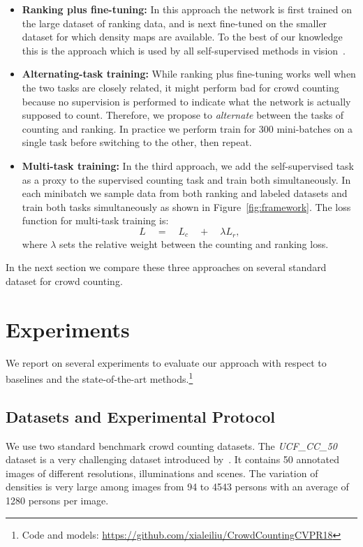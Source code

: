 \documentclass[10pt,twocolumn,letterpaper]{article}
\begin{document}
\begin{itemize}
\item \textbf{Ranking plus fine-tuning:} In this approach the network
  is first trained on the large dataset of ranking data, and is next
  fine-tuned on the smaller dataset for which density maps are
  available. To the best of our knowledge this is the approach which
  is used by all self-supervised methods in
  vision~\cite{doersch2015unsupervised,pathak2016context,zhang2016colorful,noroozi2017representation,liu2017rankiqa}.
  
\item \textbf{Alternating-task training:} While ranking plus
  fine-tuning works well when the two tasks are closely related,
  it might perform bad for crowd counting because no supervision is
  performed to indicate what the network is actually supposed to
  count. Therefore, we propose to \emph{alternate} between the tasks
  of counting and ranking. In practice we perform train for 300
  mini-batches on a single task before switching to the other, then
  repeat.  
  
\item \textbf{Multi-task training:} In the third approach, we add the
  self-supervised task as a proxy to the supervised counting task and
  train both simultaneously.  In each minibatch we sample data from
  both ranking and labeled datasets and train both tasks
  simultaneously as shown in Figure~\ref{fig:framework}. The loss
  function for multi-task training is:
\begin{equation}
L\quad =\quad { L }_{ c }\quad +\quad { \lambda L }_{ r },
\end{equation}
where $\lambda$ sets the relative weight between the counting and
ranking loss. 

\end{itemize}
In the next section we compare these three approaches on several
standard dataset for crowd counting.

\section{Experiments} \label{sec:experiments}

We report on several experiments to evaluate our
approach with respect to baselines and the state-of-the-art
methods.\footnote{Code and models: \href{url}{https://github.com/xialeiliu/CrowdCountingCVPR18}}

\subsection{Datasets and Experimental Protocol}
We use two standard benchmark crowd counting datasets. The
\emph{UCF\_CC\_50} dataset is a very challenging dataset introduced
by~\cite{idrees2013multi}. It contains 50 annotated images of
different resolutions, illuminations and scenes. The variation of
densities is very large among images from 94 to 4543 persons with
an average of 1280 persons per image.
\end{document}
